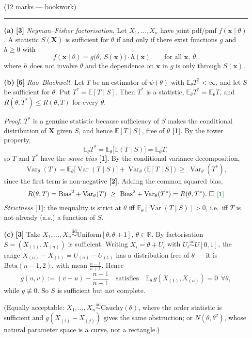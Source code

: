 \documentclass[11pt]{article}
\newcommand{\E}{\mathbb{E}}
\newcommand{\Var}{\operatorname{Var}}
\newcommand{\R}{\mathbb{R}}
\newcommand{\iid}{\overset{\text{iid}}{\sim}}
\newcommand{\mk}[1]{{\small\color{ForestGreen}\textbf{[#1]}}}
\newcommand{\qhead}[2]{\bigskip\noindent{\large\bfseries Question #1}\quad\textnormal{\small(#2)}\par
  \vspace{2pt}\hrule\vspace{6pt}}
\begin{document}
\qhead{1}{12 marks --- bookwork}

\noindent\textbf{(a)} \mk{3}
\emph{Neyman--Fisher factorisation.} Let $X_1,\dots,X_n$ have joint pdf/pmf
$f(\mathbf x\mid\theta)$. A statistic $S(\mathbf X)$ is sufficient for $\theta$ if and only if
there exist functions $g$ and $h\ge0$ with
\[
f(\mathbf x\mid\theta)=g\big(\theta,\ S(\mathbf x)\big)\cdot h(\mathbf x)
\qquad\text{for all }\mathbf x,\ \theta,
\]
where $h$ does not involve $\theta$ and the dependence on $\mathbf x$ in $g$ is only through
$S(\mathbf x)$.

\smallskip\noindent\textbf{(b)} \mk{6}
\emph{Rao--Blackwell.} Let $T$ be an estimator of $\psi(\theta)$ with
$\E_\theta T^2<\infty$, and let $S$ be sufficient for $\theta$. Put $T^{*}=\E[T\mid S]$. Then
$T^{*}$ is a statistic, $\E_\theta T^{*}=\E_\theta T$, and
$R(\theta,T^{*})\le R(\theta,T)$ for every $\theta$.

\emph{Proof.} $T^{*}$ is a genuine statistic because sufficiency of $S$ makes the conditional
distribution of $\mathbf X$ given $S$, and hence $\E[T\mid S]$, free of $\theta$ \mk{1}. By the
tower property,
\[
\E_\theta T^{*}=\E_\theta\big[\E(T\mid S)\big]=\E_\theta T ,
\]
so $T$ and $T^{*}$ have the \emph{same bias} \mk{1}. By the conditional variance decomposition,
\[
\Var_\theta(T)=\E_\theta\big[\Var(T\mid S)\big]+\Var_\theta\big(\E[T\mid S]\big)
\ \ge\ \Var_\theta(T^{*}) ,
\]
since the first term is non-negative \mk{2}. Adding the common squared bias,
\[
R(\theta,T)=\mathrm{Bias}^2+\Var_\theta(T)\ \ge\ \mathrm{Bias}^2+\Var_\theta(T^{*})=R(\theta,T^{*}).
\ \square \ \mk{1}
\]
\emph{Strictness} \mk{1}: the inequality is strict at $\theta$ iff
$\E_\theta[\Var(T\mid S)]>0$, i.e.\ iff $T$ is not already (a.s.) a function of $S$.

\smallskip\noindent\textbf{(c)} \mk{3}
Take $X_1,\dots,X_n\iid\mathrm{Uniform}[\theta,\theta+1]$, $\theta\in\R$. By factorisation
$S=(X_{(1)},X_{(n)})$ is sufficient. Writing $X_i=\theta+U_i$ with $U_i\iid U[0,1]$, the range
$X_{(n)}-X_{(1)}=U_{(n)}-U_{(1)}$ has a distribution free of $\theta$ --- it is
$\mathrm{Beta}(n-1,2)$, with mean $\tfrac{n-1}{n+1}$. Hence
\[
g(u,v):=(v-u)-\frac{n-1}{n+1}
\quad\text{satisfies}\quad \E_\theta\,g(X_{(1)},X_{(n)})=0\ \ \forall\theta,
\]
while $g\not\equiv0$. So $S$ is sufficient but not complete.

\smallskip
(Equally acceptable: $X_1,\dots,X_n\iid\mathrm{Cauchy}(\theta)$, where the order statistic is
sufficient and $g(X_{(i)}-X_{(j)})$ gives the same obstruction; or $N(\theta,\theta^2)$, whose
natural parameter space is a curve, not a rectangle.)
\end{document}
